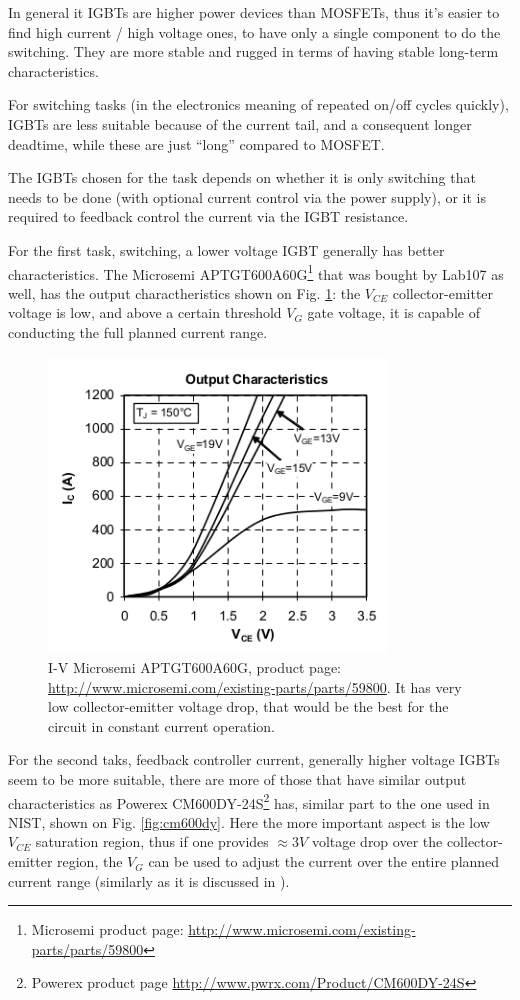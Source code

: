 \documentclass[12pt,a4paper]{article}
\begin{document}
In general it IGBTs are higher power devices than MOSFETs, thus it's easier to find high current / high voltage ones, to have only a single component to do the switching. They are more stable and rugged in terms of having stable long-term characteristics.

For switching tasks (in the electronics meaning of repeated on/off cycles quickly), IGBTs are less suitable because of the current tail, and a consequent longer deadtime, while these are just ``long'' compared to MOSFET.

The IGBTs chosen for the task depends on whether it is only switching that needs to be done (with optional current control via the power supply), or it is required to feedback control the current via the IGBT resistance.

For the first task, switching, a lower voltage IGBT generally has better characteristics. The Microsemi APTGT600A60G\footnote{Microsemi product page: \url{http://www.microsemi.com/existing-parts/parts/59800}} that was bought by Lab107 as well, has the output charactheristics shown on Fig. \ref{fig:microsemi}: the $V_{CE}$ collector-emitter voltage is low, and above a certain threshold $V_G$ gate voltage, it is capable of conducting the full planned current range.

\begin{figure}[ht!]
\centering
\includegraphics[width=90mm]{Microsemi.png}
\caption{I-V Microsemi APTGT600A60G, product page: \url{http://www.microsemi.com/existing-parts/parts/59800}. It has very low collector-emitter voltage drop, that would be the best for the circuit in constant current operation.}
\label{fig:microsemi}
\end{figure}

For the second taks, feedback controller current, generally higher voltage IGBTs seem to be more suitable, there are more of those that have similar output characteristics as Powerex CM600DY-24S\footnote{Powerex product page \url{http://www.pwrx.com/Product/CM600DY-24S}} has, similar part to the one used in NIST, shown on Fig. \ref{fig:cm600dy}. Here the more important aspect is the low $V_{CE}$ saturation region, thus if one provides $\approx 3V$ voltage drop over the collector-emitter region, the $V_G$ can be used to adjust the current over the entire planned current range (similarly as it is discussed in  \citet{Sattar}).
\end{document}
